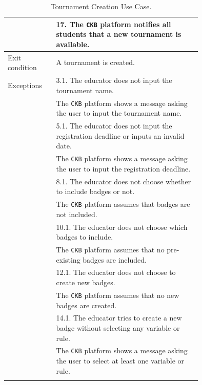 \begin{center}
\begin{longtable}{lp{0.75\linewidth}}
        & 17. The \verb|CKB| platform notifies all students that a new tournament is available.\\
        \hline
        Exit condition   & A tournament is created.   \\                                                                                                                                                                         
        \hline
        Exceptions   
        & 3.1. The educator does not input the tournament name.\\
            & The \verb|CKB| platform shows a message asking the user to input the tournament name.  \\
        & 5.1. The educator does not input the registration deadline or inputs an invalid date.\\
            & The \verb|CKB| platform shows a message asking the user to input the registration deadline.  \\
        & 8.1. The educator does not choose whether to include badges or not.\\
            & The \verb|CKB| platform assumes that badges are not included.  \\
        & 10.1. The educator does not choose which badges to include.\\
            & The \verb|CKB| platform assumes that no pre-existing badges are included.  \\
        & 12.1. The educator does not choose to create new badges.\\
            & The \verb|CKB| platform assumes that no new badges are created.  \\
        & 14.1. The educator tries to create a new badge without selecting any variable or rule.\\
            & The \verb|CKB| platform shows a message asking the user to select at least one variable or rule.  \\
        \hline
        \caption{Tournament Creation Use Case.}
        \label{tab: tournament_creation_use_case}
    \end{longtable}


\end{center}
